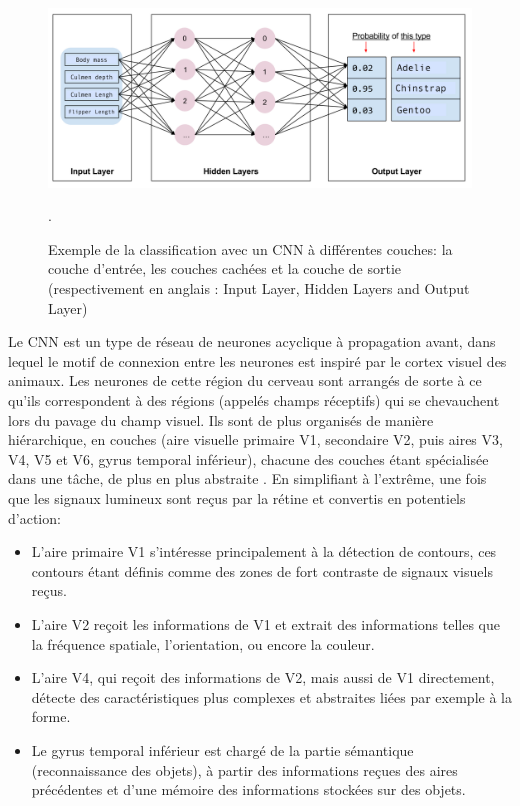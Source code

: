 	\begin{figure}[H]%
		\centering
		\includegraphics[width=\textwidth]{images/tensorflow_neuron_layer}
		\caption[Exemple de la classification avec un CNN a différentes couches]{Exemple de la classification avec un CNN à différentes couches: la couche d'entrée, les couches cachées et la couche de sortie (respectivement en anglais : Input Layer, Hidden Layers and Output Layer) \cite{ml2008python}}.
		\label{fig:cnn_layers}
	\end{figure}
	
	Le CNN est un type de réseau de neurones acyclique à propagation avant, dans lequel le motif de connexion entre les neurones est inspiré par le cortex visuel des animaux. Les neurones de cette région du cerveau sont arrangés de sorte à ce qu'ils correspondent à des régions (appelés champs réceptifs) qui se chevauchent lors du pavage du champ visuel. Ils sont de plus organisés de manière hiérarchique, en couches (aire visuelle primaire V1, secondaire V2, puis aires V3, V4, V5 et V6, gyrus temporal inférieur), chacune des couches étant spécialisée dans une tâche, de plus en plus abstraite \cite{antoine2018apprentissage}. En simplifiant à l'extrême, une fois que les signaux lumineux sont reçus par la rétine et convertis en potentiels d'action:
	\begin{itemize}
		\item L'aire primaire V1 s'intéresse principalement à la détection de contours, ces contours étant définis comme des zones de fort contraste de signaux visuels reçus.
		\item L'aire V2 reçoit les informations de V1 et extrait des informations telles que la fréquence spatiale, l'orientation, ou encore la couleur.
		\item L'aire V4, qui reçoit des informations de V2, mais aussi de V1 directement, détecte des caractéristiques plus complexes et abstraites liées par exemple à la forme.
		\item Le gyrus temporal inférieur est chargé de la partie sémantique (reconnaissance des objets), à partir des informations reçues des aires précédentes et d'une mémoire des informations stockées sur des objets.
	\end{itemize}
	
